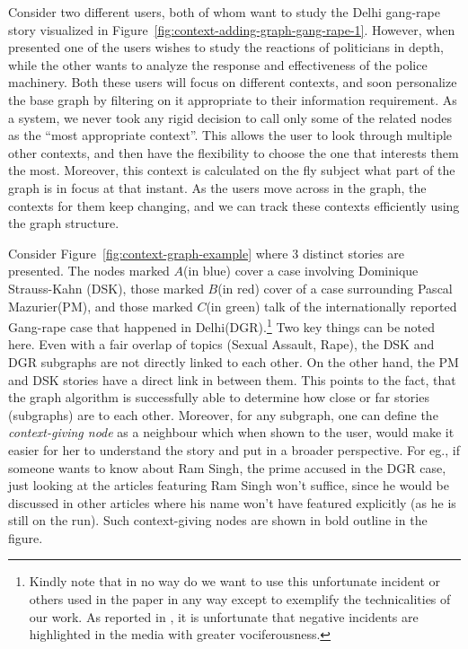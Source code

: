 Consider two different users, both of whom want to study the Delhi gang-rape story visualized in Figure~\ref{fig:context-adding-graph-gang-rape-1}. However, when presented
one of the users wishes to study the reactions of politicians in depth, while the other wants to analyze the response and effectiveness of the police
machinery. Both these users will focus on different contexts, and soon personalize the base graph by filtering on it appropriate to their information
requirement. As a system, we never took any rigid decision to call only some of the related nodes as the ``most appropriate context''. This allows
the user to look through multiple other contexts, and then have the flexibility to choose the one that interests them the most. Moreover, this context
is calculated on the fly subject what part of the graph is in focus at that instant. As the users move across in the graph, the contexts for them keep
changing, and we can track these contexts efficiently using the graph structure.

Consider Figure~\ref{fig:context-graph-example} where 3 distinct stories are presented. The nodes marked $A$(in blue) cover a case involving Dominique Strauss-Kahn (DSK), 
those marked $B$(in red) cover of a case surrounding Pascal Mazurier(PM), and those marked $C$(in green) talk of the internationally reported Gang-rape case
that happened in Delhi(DGR).\footnote{Kindly note that in no way do we want to use this unfortunate incident or others used in the paper in any way except 
to exemplify the technicalities of our work. As reported in \cite{subasic-icdm:2008}, it is unfortunate that negative incidents are highlighted in the media
with greater vociferousness.} Two key things can be noted here. Even with a fair overlap of topics (Sexual Assault, Rape), the DSK and DGR subgraphs are not directly linked to each other.
On the other hand, the PM and DSK stories have a direct link in between them. This points to the fact, that the graph algorithm is successfully able
to determine how close or far stories (subgraphs) are to each other. Moreover, for any subgraph, one can define the \emph{context-giving node} as 
a neighbour which when shown to the user, would make it easier for her to understand the story and put in a broader perspective. For eg., if someone
wants to know about Ram Singh, the prime accused in the DGR case, just looking at the articles featuring Ram Singh won't suffice, since he would be
discussed in other articles where his name won't have featured explicitly (as he is still on the run). Such context-giving nodes are shown in bold outline in the figure.

